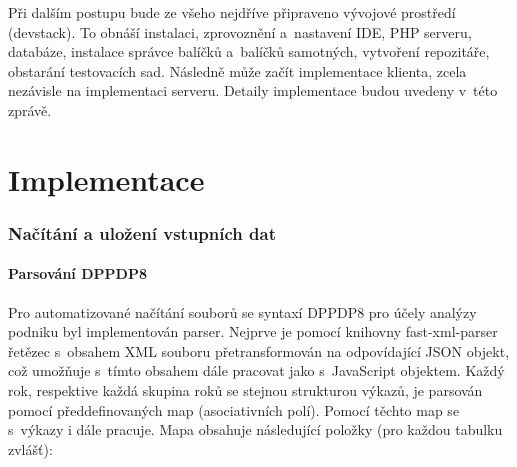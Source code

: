 Při dalším postupu bude ze všeho nejdříve připraveno vývojové prostředí (devstack). To obnáší instalaci, zprovoznění a~nastavení IDE, PHP serveru, databáze, instalace správce balíčků a~balíčků samotných, vytvoření repozitáře, obstarání testovacích sad. Následně může začít implementace klienta, zcela nezávisle na implementaci serveru. Detaily implementace budou uvedeny v~této zprávě.





















































\chapter{Implementace}


\subsection{Načítání a uložení vstupních dat}

\subsubsection{Parsování DPPDP8}
Pro automatizované načítání souborů se syntaxí DPPDP8 pro účely analýzy podniku byl implementován parser. Nejprve je pomocí knihovny fast-xml-parser řetězec s~obsahem XML souboru přetransformován na odpovídající JSON objekt, což umožňuje s~tímto obsahem dále pracovat jako s~JavaScript objektem. Každý rok, respektive každá skupina roků se stejnou strukturou výkazů, je parsován pomocí předdefinovaných map (asociativních polí). Pomocí těchto map se s~výkazy i dále pracuje. Mapa obsahuje následující položky (pro každou tabulku zvlášť):

